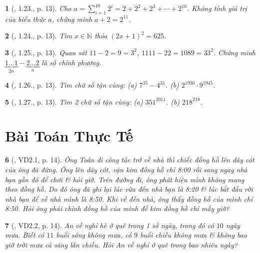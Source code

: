\documentclass{article}
\newtheorem{baitoan}{}
\begin{document}
\begin{baitoan}[\cite{TLCT_THCS_Toan_6_so_hoc}, 1.23., p. 13]
	Cho $a = \sum_{i=1}^{10} 2^i = 2 + 2^2 + 2^3 + \cdots + 2^{10}$. Không tính giá trị của biểu thức $a$, chứng minh $a + 2 = 2^11$.
\end{baitoan}

\begin{baitoan}[\cite{TLCT_THCS_Toan_6_so_hoc}, 1.24., p. 13]
	Tìm $x\in\mathbb{N}$ thỏa $(2x + 1)^2 = 625$.
\end{baitoan}

\begin{baitoan}[\cite{TLCT_THCS_Toan_6_so_hoc}, 1.25., p. 13]
	Quan sát $11 - 2 = 9 = 3^2$, $1111 - 22 = 1089 = 33^2$. Chứng minh $\underbrace{1\ldots1}_{2n} - \underbrace{2\ldots2}_n$ là số chính phương.
\end{baitoan}

\begin{baitoan}[\cite{TLCT_THCS_Toan_6_so_hoc}, 1.26., p. 13]
	Tìm chữ số tận cùng: (a) $7^{35} - 4^{31}$. (b) $2^{1930}\cdot9^{1945}$.
\end{baitoan}

\begin{baitoan}[\cite{TLCT_THCS_Toan_6_so_hoc}, 1.27., p. 13]
	Tìm 2 chữ số tận cùng: (a) $351^{2011}$. (b) $218^{218}$.
\end{baitoan}


\section{Bài Toán Thực Tế}

\begin{baitoan}[\cite{TLCT_THCS_Toan_6_so_hoc}, VD2.1, p. 14]
	Ông Toàn đi công tác trở về nhà thì chiếc đồng hồ lên dây cót của ông đã đứng. Ông lên dây cót, vặn kim đồng hồ chỉ {\rm8:00} rồi sang ngay nhà bạn gần đó để chơi \& hỏi giờ. Trên đường đi, ông phát hiện mình không mang theo đồng hồ. Do đó ông đã ghi lại lúc vừa đến nhà bạn là {\rm8:20} \& lúc bắt đầu rời nhà bạn để về nhà mình là {\rm8:50}. Khi về đến nhà, ông thấy đồng hồ của mình chỉ {\rm8:50}. Hỏi ông phải chỉnh đồng hồ của mình để kim đồng hồ chỉ mấy giờ?
\end{baitoan}

\begin{baitoan}[\cite{TLCT_THCS_Toan_6_so_hoc}, VD2.2, p. 14]
	An về nghỉ hè ở quê trong 1 số ngày, trong đó có $10$ ngày mưa. Biết có $11$ buổi sáng không mưa, có $9$ buổi chiều không mưa \& không bao giờ trời mưa cả sáng lẫn chiều. Hỏi An về nghỉ ở quê trong bao nhiêu ngày?
\end{baitoan}
\end{document}
